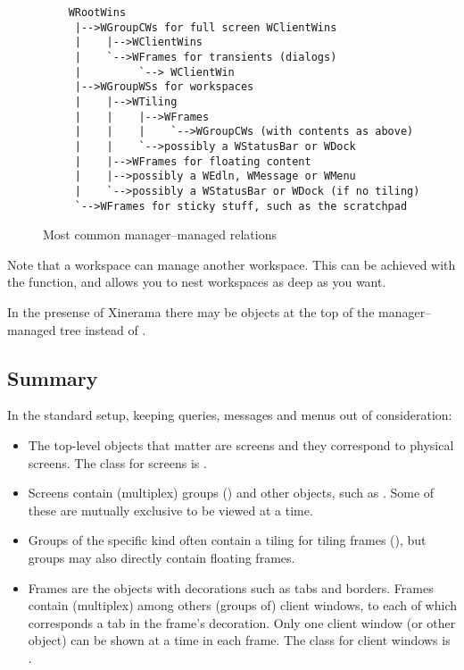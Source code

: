 \begin{figure}
\begin{htmlonly}
\docode %
\end{htmlonly}
\begin{verbatim}
    WRootWins
     |-->WGroupCWs for full screen WClientWins
     |    |-->WClientWins
     |    `-->WFrames for transients (dialogs)
     |         `--> WClientWin
     |-->WGroupWSs for workspaces
     |    |-->WTiling
     |    |    |-->WFrames
     |    |    |    `-->WGroupCWs (with contents as above)
     |    |    `-->possibly a WStatusBar or WDock
     |    |-->WFrames for floating content
     |    |-->possibly a WEdln, WMessage or WMenu
     |    `-->possibly a WStatusBar or WDock (if no tiling)
     `-->WFrames for sticky stuff, such as the scratchpad
\end{verbatim}
\caption{Most common manager--managed relations}
\label{fig:managership}
\end{figure}

Note that a workspace can manage another workspace. This can be
achieved with the  function, and allows you to nest
workspaces as deep as you want.


In the presense of Xinerama there may be  
objects at the top of the manager--managed tree instead of .

\subsection{Summary}

In the standard setup, keeping queries, messages and menus out of
consideration:

\begin{itemize}
  \item The top-level objects that matter are screens and they correspond
    to physical screens. The class for screens is .
  \item Screens contain (multiplex) groups () and other 
    objects, such as . Some of these are mutually exclusive
    to be viewed at a time.
  \item Groups of the specific kind  often contain a
     tiling for tiling frames (), but 
    groups may also directly contain floating frames.
  \item Frames are the objects with decorations such as tabs and borders.
    Frames contain (multiplex) among others (groups of) client windows, 
    to each of which corresponds a tab in the frame's decoration. Only 
    one client window (or other object) can be shown at a time in each 
    frame. The class for client windows is .
\end{itemize}

